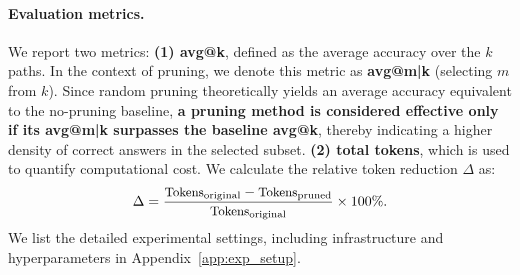 \documentclass[11pt]{article}
\theoremstyle{plain}
\begin{document}
\paragraph{Evaluation metrics.}
We report two metrics: \textbf{(1) avg@k}, defined as the average accuracy over the $k$ paths. 
In the context of pruning, we denote this metric as \textbf{avg@m|k} (selecting $m$ from $k$). 
Since random pruning theoretically yields an average accuracy equivalent to the no-pruning baseline, \textbf{a pruning method is considered effective only if its avg@m|k surpasses the baseline avg@k}, thereby indicating a higher density of correct answers in the selected subset.
\textbf{(2) total tokens}, which is used to quantify computational cost.
We calculate the relative token reduction $\Delta$ as:
\begin{equation}\small
    \Delta = \frac{\text{Tokens}_{\text{original}} - \text{Tokens}_{\text{pruned}}}{\text{Tokens}_{\text{original}}} \times 100\%.
\end{equation}
We list the detailed experimental settings, including infrastructure and hyperparameters in Appendix~\ref{app:exp_setup}.

\end{document}
